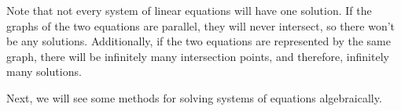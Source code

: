 \documentclass[nooutcomes]{ximera}
\begin{document}
Note that not every system of linear equations will have one solution. If the graphs of the two equations are parallel, they will never intersect, so there won't be any solutions. Additionally, if the two equations are represented by the same graph, there will be infinitely many intersection points, and therefore, infinitely many solutions. 

Next, we will see some methods for solving systems of equations algebraically. 

%
%
%
%
%
%
%
%
%
%
%
%
%
%
\end{document}

